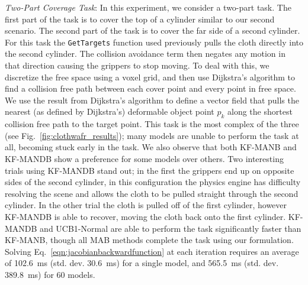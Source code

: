 \textit{Two-Part Coverage Task}: In this experiment, we consider a two-part task. The first part of the task is to cover the top of a cylinder similar to our second scenario. The second part of the task is to cover the far side of a second cylinder. For this task the \texttt{GetTargets} function used previously pulls the cloth directly into the second cylinder. The collision avoidance term then negates any motion in that direction causing the grippers to stop moving. To deal with this, we discretize the free space using a voxel grid, and then use Dijkstra's algorithm to find a collision free path between each cover point and every point in free space. We use the result from Dijkstra's algorithm to define a vector field that pulls the nearest (as defined by Dijkstra's) deformable object point $p_k$ along the shortest collision free path to the target point. This task is the most complex of the three (see Fig.~\ref{fig:clothwafr_results}); many models are unable to perform the task at all, becoming stuck early in the task. We also observe that both KF-MANB and KF-MANDB show a preference for some models over others. Two interesting trials using KF-MANDB stand out; in the first the grippers end up on opposite sides of the second cylinder, in this configuration the physics engine has difficulty resolving the scene and allows the cloth to be pulled straight through the second cylinder. In the other trial the cloth is pulled off of the first cylinder, however KF-MANDB is able to recover, moving the cloth back onto the first cylinder. KF-MANDB and UCB1-Normal are able to perform the task significantly faster than KF-MANB, though all MAB methods complete the task using our formulation. Solving Eq.~\eqref{eqn:jacobianbackwardfunction} at each iteration requires an average of 102.6~ms (std. dev. 30.6~ms) for a single model, and 565.5~ms (std. dev. 389.8~ms) for 60 models.


\begin{figure*}[t]
    \centering
    \\
    \vspace{-0.15in}
    \vspace{-0.1in}
    \caption{Experimental results for the two-part coverage task. See Fig.~\ref{fig:ropecylinder_results} for description.}
    \label{fig:clothwafr_results}
\end{figure*}
